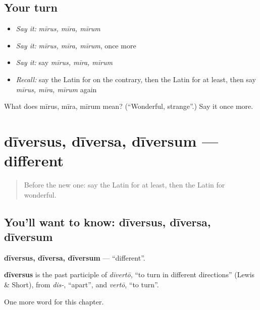\subsection*{Your turn}
\begin{itemize}
\raggedright
  \item \emph{Say it:} \emph{mīrus, mīra, mīrum}
  \item \emph{Say it:} \emph{mīrus, mīra, mīrum}, once more
  \item \emph{Say it:} say \emph{mīrus, mīra, mīrum}
  \item \emph{Recall:} say the Latin for on the contrary, then the Latin for at least, then say \emph{mīrus, mīra, mīrum} again
\end{itemize}

\begin{tcolorbox}[breakable,colback=teal!4,colframe=teal!35!black,title={Before you move on}]
What does mīrus, mīra, mīrum mean? (\textquotedblleft{}Wonderful, strange\textquotedblright{}.) Say it once more.
\end{tcolorbox}
\section[dīversus, dīversa, dīversum]{dīversus, dīversa, dīversum — different}

\label{lesson:LA-C266-diversus}



\begin{quote}
Before the new one: say the Latin for at least, then the Latin for wonderful.
\end{quote}

\subsection*{You'll want to know: dīversus, dīversa, dīversum}
\textbf{dīversus, dīversa, dīversum} — \textquotedblleft{}different\textquotedblright{}.

\begin{cousinweb}
\textbf{dīversus} is the past participle of \emph{dīvertō}, \textquotedblleft{}to turn in different directions\textquotedblright{} (Lewis \& Short), from \emph{dis-}, \textquotedblleft{}apart\textquotedblright{}, and \emph{vertō}, \textquotedblleft{}to turn\textquotedblright{}.
\end{cousinweb}

\begin{grammarlens}[title={What you've built}]
One more word for this chapter.
\end{grammarlens}

